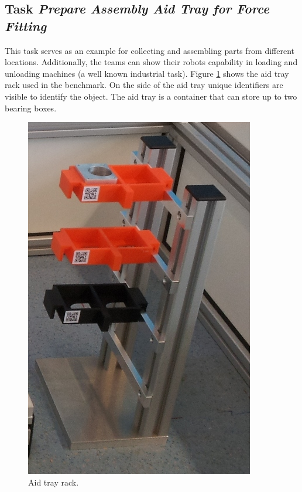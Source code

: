 
\subsection{Task \emph{Prepare Assembly Aid Tray for Force Fitting}}
\label{ssec:TaskAssemblyAidTray}

This task serves as an example for collecting and assembling parts from different locations. 
Additionally, the teams can show their robots capability in loading and unloading machines (a well known industrial task).
Figure \ref{fig:AidTrayRack} shows the aid tray rack used in the benchmark. On the side of the aid tray unique identifiers are visible to identify the object.
The aid tray is a container that can store up to two bearing boxes.

\begin{figure}[!htbp]
	\begin{center}
		\includegraphics[scale=0.5,angle=0]{pics/atwork/arena_elements/Aid_tray_rack}
		\caption{\roaw Aid tray rack.}
		\label{fig:AidTrayRack}
	\end{center}
\end{figure}

